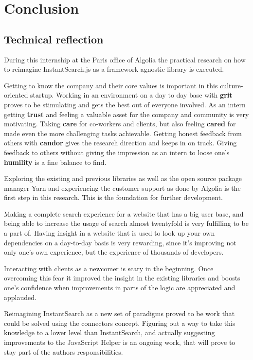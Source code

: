 
\chapter{Conclusion} %
\label{chp:conclusion}

\section*{Technical reflection}

During this internship at the Paris office of Algolia the practical research on how to reimagine InstantSearch.js as a framework-agnostic library is executed.

Getting to know the company and their core values is important in this culture-oriented startup. Working in an environment on a day to day base with \textbf{grit} proves to be stimulating and gets the best out of everyone involved. As an intern getting \textbf{trust} and feeling a valuable asset for the company and community is very motivating. Taking \textbf{care} for co-workers and clients, but also feeling \textbf{cared} for made even the more challenging tasks achievable. Getting honest feedback from others with \textbf{candor} gives the research direction and keeps in on track. Giving feedback to others without giving the impression as an intern to loose one's \textbf{humility} is a fine balance to find.

Exploring the existing and previous libraries as well as the open source package manager Yarn and experiencing the customer support as done by Algolia is the first step in this research. This is the foundation for further development.

Making a complete search experience for a website that has a big user base, and being able to increase the usage of search almost twentyfold is very fulfilling to be a part of. Having insight in a website that is used to look up your own dependencies on a day-to-day basis is very rewarding, since it's improving not only one's own experience, but the experience of thousands of developers.

Interacting with clients as a newcomer is scary in the beginning. Once overcoming this fear it improved the insight in the existing libraries and boosts one's confidence when improvements in parts of the logic are appreciated and applauded.

Reimagining InstantSearch as a new set of paradigms proved to be work that could be solved using the connectors concept. Figuring out a way to take this knowledge to a lower level than InstantSearch, and actually suggesting improvements to the JavaScript Helper is an ongoing work, that will prove to stay part of the authors responsibilities.

